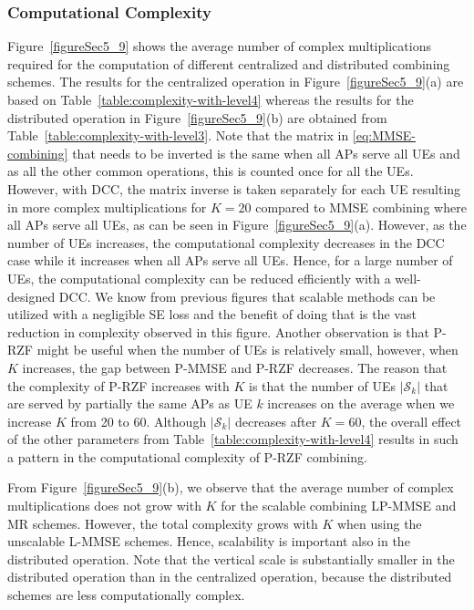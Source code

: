 \subsubsection{Computational Complexity}

Figure~\ref{figureSec5_9} shows the average number of complex multiplications required for the computation of different centralized and distributed combining schemes. The results for the centralized operation in Figure~\ref{figureSec5_9}(a) are based on Table~\ref{table:complexity-with-level4} whereas the results for the distributed operation in Figure~\ref{figureSec5_9}(b) are obtained from Table~\ref{table:complexity-with-level3}. Note that the matrix in  \eqref{eq:MMSE-combining} that needs to be inverted is the same when all APs serve all UEs and as all the other common operations, this is counted once for all the UEs. However, with DCC, the matrix inverse is taken separately for each UE resulting in more complex multiplications for $K=20$ compared to MMSE combining where all APs serve all UEs, as can be seen in Figure~\ref{figureSec5_9}(a). However, as the number of UEs increases, the computational complexity decreases in the DCC case while it increases when all APs serve all UEs. Hence, for a large number of UEs, the computational complexity can be reduced efficiently with a well-designed DCC. We know from previous figures that scalable methods can be utilized with a negligible SE loss and the benefit of doing that is the vast reduction in complexity observed in this figure.
Another observation is that P-RZF might be useful when the number of UEs is relatively small, however, when $K$ increases, the gap between P-MMSE and P-RZF decreases. The reason that the complexity of P-RZF increases with $K$ is that the number of UEs $|\mathcal{S}_k|$ that are served by partially the same APs as UE $k$ increases on the average when we increase $K$ from 20 to 60. Although $|\mathcal{S}_k|$ decreases after $K=60$, the overall effect of the other parameters from Table~\ref{table:complexity-with-level4} results in such a pattern in the computational complexity of P-RZF combining.

From Figure~\ref{figureSec5_9}(b), we observe that the average number of complex multiplications does not grow with $K$ for the scalable combining LP-MMSE and MR schemes. However, the total complexity grows with $K$ when using the unscalable L-MMSE schemes. Hence, scalability is important also in the distributed operation. Note that the vertical scale is substantially smaller in the distributed operation than in the centralized operation, because the distributed schemes are less computationally complex.




